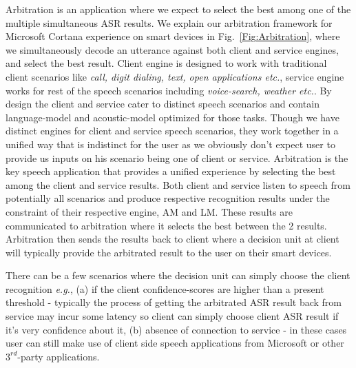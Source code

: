 Arbitration is an application where we expect to select the best among one of the multiple simultaneous ASR results.
We explain our arbitration framework for Microsoft Cortana experience on smart devices in Fig.~\ref{Fig:Arbitration}, where we simultaneously decode an utterance against both client and service engines, and select the best result. Client engine is designed to work with traditional client scenarios like \emph{call, digit dialing, text, open applications etc.}, service engine works for rest of the speech scenarios including \emph{voice-search, weather etc.}. By design the client and service cater to distinct speech scenarios and contain language-model and acoustic-model optimized for those tasks. Though we have distinct engines for client and service speech scenarios, they work together in a unified way that is indistinct for the user as we obviously don't expect user to provide us inputs on his scenario being one of client or service. Arbitration is the key speech application that provides a unified experience by selecting the best among the client and service results.  Both client and service listen to speech from potentially all scenarios and produce respective recognition results under the constraint of their respective engine, AM and LM. These results are communicated to arbitration where it selects the best between the 2 results. Arbitration then sends the results back to client where a decision unit at client will typically provide the arbitrated result to the user on their smart devices.

There can be a few scenarios where the decision unit can simply choose the client recognition \emph{e.g.}, (a) if the client confidence-scores are higher than a present threshold - typically the process of getting the arbitrated ASR result back from service may incur some latency so client can simply choose client ASR result if it's very confidence about it, (b) absence of connection to service - in these cases user can still make use of client side speech applications from Microsoft or other $3^{rd}$-party applications. 


